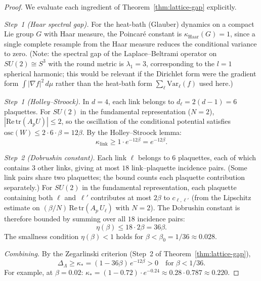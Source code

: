 \documentclass[12pt,a4paper]{article}
\theoremstyle{definition}
\theoremstyle{plain}
\theoremstyle{remark}
\begin{document}
\begin{proof}
We evaluate each ingredient of Theorem~\ref{thm:lattice-gap} explicitly.

\emph{Step~1 (Haar spectral gap).} For the heat-bath (Glauber) dynamics on a compact Lie group $G$ with Haar measure, the Poincar\'e constant is $\kappa_{\mathrm{Haar}}(G) = 1$, since a single complete resample from the Haar measure reduces the conditional variance to zero.  (Note: the spectral gap of the Laplace--Beltrami operator on $SU(2) \cong S^3$ with the round metric is $\lambda_1 = 3$, corresponding to the $l=1$ spherical harmonic; this would be relevant if the Dirichlet form were the gradient form $\int |\nabla f|^2\,d\mu$ rather than the heat-bath form $\sum_\ell \mathrm{Var}_\ell(f)$ used here.)

\emph{Step~1 (Holley--Stroock).} In $d=4$, each link belongs to $d_\ell = 2(d-1) = 6$ plaquettes. For $SU(2)$ in the fundamental representation ($N=2$), $|\mathrm{Re}\,\mathrm{tr}(A_p U)| \leq 2$, so the oscillation of the conditional potential satisfies $\mathrm{osc}(W) \leq 2 \cdot 6 \cdot \beta = 12\beta$. By the Holley--Stroock lemma:
\[
    \kappa_{\mathrm{link}} \geq 1 \cdot e^{-12\beta} = e^{-12\beta}.
\]

\emph{Step~2 (Dobrushin constant).} Each link $\ell$ belongs to $6$ plaquettes, each of which contains $3$ other links, giving at most $18$ link--plaquette incidence pairs. (Some link pairs share two plaquettes; the bound counts each plaquette contribution separately.) For $SU(2)$ in the fundamental representation, each plaquette containing both $\ell$ and~$\ell'$ contributes at most $2\beta$ to $c_{\ell,\ell'}$ (from the Lipschitz estimate on $(\beta/N)\,\mathrm{Re}\,\mathrm{tr}(A_p\,U_\ell)$ with $N = 2$). The Dobrushin constant is therefore bounded by summing over all $18$ incidence pairs:
\[
    \eta(\beta) \leq 18 \cdot 2\beta = 36\beta.
\]
The smallness condition $\eta(\beta) < 1$ holds for $\beta < \beta_0 = 1/36 \approx 0.028$.

\emph{Combining.} By the Zegarlinski criterion (Step~2 of Theorem~\ref{thm:lattice-gap}),
\[
    \Delta_\Lambda \geq \kappa_* = (1 - 36\beta)\,e^{-12\beta} > 0 \quad\text{for}\;\beta < 1/36.
\]
For example, at $\beta = 0.02$: $\kappa_* = (1 - 0.72)\cdot e^{-0.24} \approx 0.28 \cdot 0.787 \approx 0.220$.
\end{proof}

\end{document}
